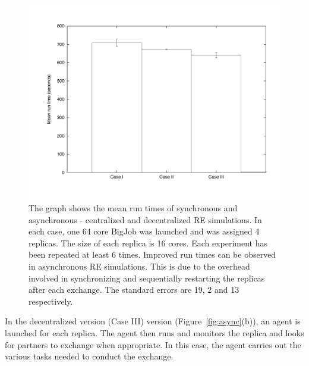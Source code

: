 \documentclass[a4paper,10pt]{article}
\begin{document}
%
\begin{figure}
\centering
\includegraphics[scale=0.250]{figures/sd_cent_decent.pdf}
\caption{\small The graph shows the mean run times of synchronous and asynchronous - centralized and decentralized RE simulations. In each case, one 64 core BigJob was launched and was assigned 4 replicas. The size of each replica is 16 cores. Each experiment has been repeated at least 6 times. Improved run times can be observed in asynchronous RE simulations. This is due to the overhead involved in synchronizing and sequentially restarting the replicas after each exchange. The standard errors are 19, 2 and 13 respectively.}
\label{fig:graph}
\vspace{-1em}
\end{figure}

 

In the decentralized version (Case III) version
(Figure~\ref{fig:async}(b)), an agent is launched for each replica. %
The agent then runs and monitors the replica and looks for partners to exchange when appropriate. In this case, the agent carries out the various tasks needed to conduct the exchange. %
\end{document}
